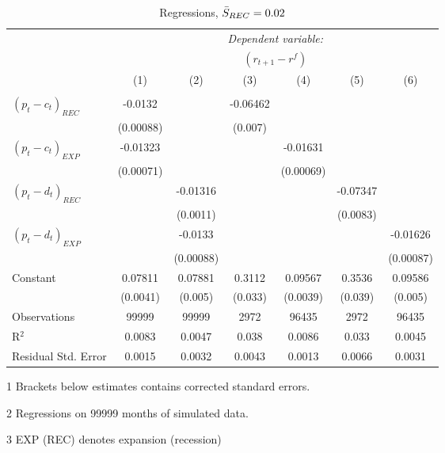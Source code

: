 \begin{table}[H]
\centering   
  \caption{Regressions, $\Bar{S}_{REC} = 0.02$}           
  \label{tabregress2}
  \begin{threeparttable}
\begin{tabular}{@{\hspace{5pt}}l@{\hspace{5pt}}cccccc} 
\toprule 
 & \multicolumn{6}{c}{\textit{Dependent variable:}} \\ 
 & \multicolumn{6}{c}{$\left(r_{t+1}-r^f\right)$} \\ 
 \cmidrule(rr){2-7}
 & (1) & (2) & (3) & (4) & (5) & (6) \\ 
\midrule  
\\[-2.1ex] $\left( p_t - c_t \right)_{REC}$ &-0.0132& &-0.06462 & & &\\ 
  & (0.00088) & &(0.007) & & & \\ 
 \addlinespace 
  $\left( p_t - c_t \right)_{EXP}$ &-0.01323  &    & &-0.01631 & &  \\ 
  & (0.00071) & & &(0.00069) & & \\ 
 \addlinespace 
  $\left( p_t - d_t \right)_{REC}$ & &-0.01316& & & -0.07347  &   \\ 
                                   & &  (0.0011) & & & (0.0083) &    \\ 
 \addlinespace 
  $\left( p_t - d_t \right)_{EXP}$ & &   -0.0133& & & &-0.01626 \\ 
                                   & &  (0.00088) & & & &(0.00087) \\ 
 \addlinespace 
 Constant &0.07811 &0.07881&0.3112 &0.09567 &0.3536 &0.09586 \\ 
          &(0.0041) &(0.005)&(0.033)&(0.0039)&(0.039)&(0.005) \\ 
 \addlinespace 
\midrule  
Observations & 99999 & 99999&2972 & 96435&2972&96435\\
R$^{2}$ &0.0083 & 0.0047&0.038&0.0086&0.033&0.0045 \\ 
Residual Std. Error &0.0015 & 0.0032&0.0043&0.0013&0.0066&0.0031 \\ 
\bottomrule 
\end{tabular} 
\begin{tablenotes}
\footnotesize{
\item[1] Brackets below estimates contains \citet{NW87} corrected standard errors. 
\item[2] Regressions on 99999 months of simulated data.
\item[3] EXP (REC) denotes expansion (recession)
}
\end{tablenotes}
\end{threeparttable}
\end{table} 
